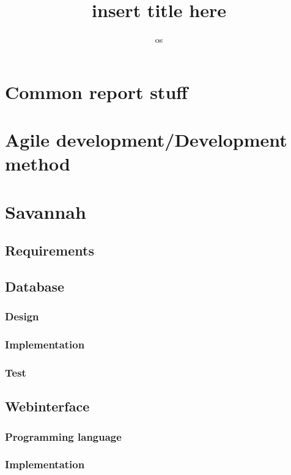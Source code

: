 

\title{insert title here}
\author{os}


\maketitle
\tableofcontents




\chapter{Common report stuff} %
\chapter{Agile development/Development method} %
\chapter{Savannah} %
  \section{Requirements}
  \section{Database}
    \subsection{Design}
    \subsection{Implementation}
    \subsection{Test}

  \section{Webinterface}
     \subsection{Programming language}
      
     \subsection{Implementation}
